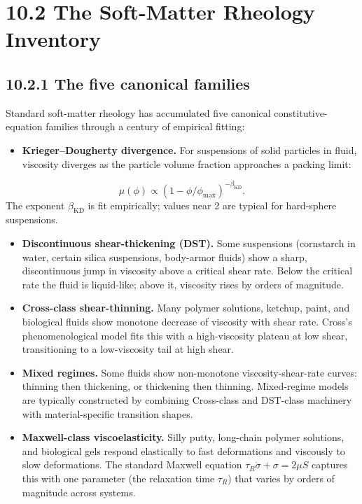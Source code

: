 \documentclass[11pt]{book}
\begin{document}
\section{10.2 The Soft-Matter Rheology Inventory}

\subsection{10.2.1 The five canonical families}

Standard soft-matter rheology has accumulated five canonical constitutive-equation families through a century of empirical fitting:

\begin{itemize}
\item \textbf{Krieger–Dougherty divergence.} For suspensions of solid particles in fluid, viscosity diverges as the particle volume fraction approaches a packing limit:
\end{itemize}
\[
\mu(\phi) \propto \left(1 - \phi/\phi_\mathrm{max}\right)^{-\beta_\mathrm{KD}}.
\]
  The exponent $\beta_\mathrm{KD}$ is fit empirically; values near 2 are typical for hard-sphere suspensions.
\begin{itemize}
\item \textbf{Discontinuous shear-thickening (DST).} Some suspensions (cornstarch in water, certain silica suspensions, body-armor fluids) show a sharp, discontinuous jump in viscosity above a critical shear rate. Below the critical rate the fluid is liquid-like; above it, viscosity rises by orders of magnitude.
\item \textbf{Cross-class shear-thinning.} Many polymer solutions, ketchup, paint, and biological fluids show monotone decrease of viscosity with shear rate. Cross's phenomenological model fits this with a high-viscosity plateau at low shear, transitioning to a low-viscosity tail at high shear.
\item \textbf{Mixed regimes.} Some fluids show non-monotone viscosity-shear-rate curves: thinning then thickening, or thickening then thinning. Mixed-regime models are typically constructed by combining Cross-class and DST-class machinery with material-specific transition shapes.
\item \textbf{Maxwell-class viscoelasticity.} Silly putty, long-chain polymer solutions, and biological gels respond elastically to fast deformations and viscously to slow deformations. The standard Maxwell equation $\tau_R\dot\sigma + \sigma = 2\mu S$ captures this with one parameter (the relaxation time $\tau_R$) that varies by orders of magnitude across systems.
\end{itemize}
\end{document}
